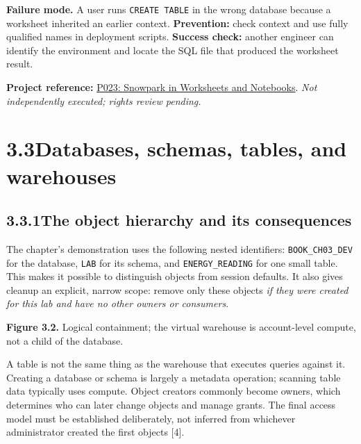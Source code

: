 \documentclass[11pt,twoside]{article}
\newcommand{\topic}[2]{\subsection*{#1\quad #2}}
\newcommand{\repo}[2]{\par\begingroup\fontsize{8.0}{9.6}\selectfont\sffamily\color{inkgray}\textbf{Project reference:} \href{#2}{#1}. \textit{Not independently executed; rights review pending.}\par\endgroup}
\begin{document}
\textbf{Failure mode.} A user runs \texttt{CREATE TABLE} in the wrong database because a worksheet inherited an earlier context. \textbf{Prevention:} check context and use fully qualified names in deployment scripts. \textbf{Success check:} another engineer can identify the environment and locate the SQL file that produced the worksheet result.
\repo{P023: Snowpark in Worksheets and Notebooks}{https://github.com/Snowflake-Labs/sfguide-getting-started-with-snowpark-in-worksheets-notebooks}

\newpage
\section*{3.3\quad Databases, schemas, tables, and warehouses}
\topic{3.3.1}{The object hierarchy and its consequences}
The chapter's demonstration uses the following nested identifiers: \texttt{BOOK\_CH03\_DEV} for the database, \texttt{LAB} for its schema, and \texttt{ENERGY\_READING} for one small table. This makes it possible to distinguish objects from session defaults. It also gives cleanup an explicit, narrow scope: remove only these objects \emph{if they were created for this lab and have no other owners or consumers}.

\begin{center}
\end{center}
{\small\color{inkgray}\textbf{Figure 3.2.} Logical containment; the virtual warehouse is account-level compute, not a child of the database.}\par
A table is not the same thing as the warehouse that executes queries against it. Creating a database or schema is largely a metadata operation; scanning table data typically uses compute. Object creators commonly become owners, which determines who can later change objects and manage grants. The final access model must be established deliberately, not inferred from whichever administrator created the first objects [4].
\end{document}
